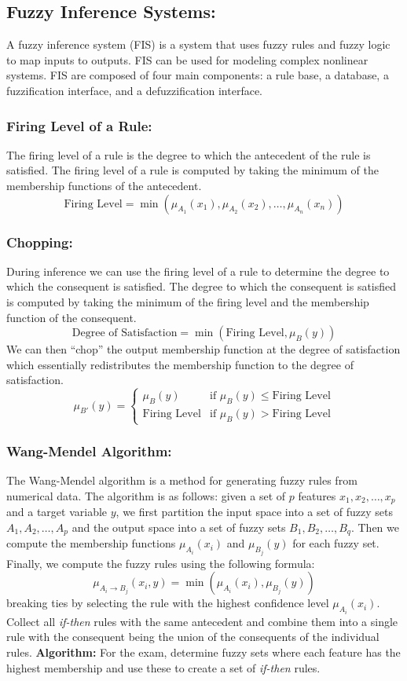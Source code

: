 \subsection{Fuzzy Inference Systems:} A fuzzy inference system (FIS) is a system that uses fuzzy rules and fuzzy logic to map inputs to outputs. FIS can be used for modeling complex nonlinear systems. FIS are composed of four main components: a rule base, a database, a fuzzification interface, and a defuzzification interface.
\subsubsection{Firing Level of a Rule:} The firing level of a rule is the degree to which the antecedent of the rule is satisfied. The firing level of a rule is computed by taking the minimum of the membership functions of the antecedent. \[\text{Firing Level}=\min(\mu_{A_1}(x_1),\mu_{A_2}(x_2),\dots,\mu_{A_n}(x_n))\]
\subsubsection{Chopping:} During inference we can use the firing level of a rule to determine the degree to which the consequent is satisfied. The degree to which the consequent is satisfied is computed by taking the minimum of the firing level and the membership function of the consequent. \[\text{Degree of Satisfaction}=\min(\text{Firing Level},\mu_{B}(y))\] We can then ``chop'' the output membership function at the degree of satisfaction which essentially redistributes the membership function to the degree of satisfaction. \[\mu_{B'}(y)=\begin{cases}
    \mu_B(y) & \text{if } \mu_B(y)\leq \text{Firing Level}\\
    \text{Firing Level} & \text{if } \mu_B(y)>\text{Firing Level}\end{cases}\]
\subsubsection{Wang-Mendel Algorithm:} The Wang-Mendel algorithm is a method for generating fuzzy rules from numerical data. The algorithm is as follows: given a set of \(p\) features \(x_1,x_2,\dots,x_p\) and a target variable \(y\), we first partition the input space into a set of fuzzy sets \(A_1,A_2,\dots,A_p\) and the output space into a set of fuzzy sets \(B_1,B_2,\dots,B_q\). Then we compute the membership functions \(\mu_{A_i}(x_i)\) and \(\mu_{B_j}(y)\) for each fuzzy set. Finally, we compute the fuzzy rules using the following formula: \[\mu_{A_i\rightarrow B_j}(x_i,y)=\min(\mu_{A_i}(x_i),\mu_{B_j}(y))\] breaking ties by selecting the rule with the highest confidence level \(\mu_{A_i}(x_i)\). Collect all \emph{if-then} rules with the same antecedent and combine them into a single rule with the consequent being the union of the consequents of the individual rules.
\textbf{Algorithm:} For the exam, determine fuzzy sets where each feature has the highest membership and use these to create a set of \emph{if-then} rules.
